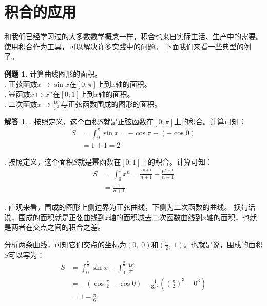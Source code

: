\documentclass[12pt,UTF8]{ctexbook}
\theoremstyle{definition}
\newtheorem{et}{例题}[section]
\newtheorem*{so}{解答}
\theoremstyle{plain}
\begin{document}
\section{积合的应用}

和我们已经学习过的大多数数学概念一样，积合也来自实际生活、生产中的需要。使用积合作为工具，可以解决许多实践中的问题。
下面我们来看一些典型的例子。

\begin{et}
    计算曲线图形的面积。\\
    . 正弦函数$x\mapsto \sin{x}$在$[0;\pi]$上到$x$轴的面积。 \\
    . 幂函数$x\mapsto x^n$在$[0;1]$上到$x$轴的面积。\\
    . 二次函数$x \mapsto \frac{4x^2}{\pi^2}$与正弦函数围成的图形的面积。
\end{et}

\begin{so}
    . 按照定义，这个面积$S$就是正弦函数在$[0;\pi]$上的积合。计算可知：
    \begin{align*}
        S &= \int_{0}^{\pi} \sin{x} = -\cos{\pi} - (-\cos{0}) \\
        &= 1 + 1 = 2
    \end{align*}

    . 按照定义，这个面积$S$就是幂函数在$[0;1]$上的积合。计算可知：
    \begin{align*}
        S &= \int_{0}^{1} x^n = \frac{1^{n+1}}{n+1}- \frac{0^{n+1}}{n+1} \\
        &= \frac{1}{n+1}
    \end{align*}

    . 直观来看，围成的图形上侧边界为正弦曲线，下侧为二次函数的曲线。
    换句话说，围成的面积就是正弦曲线到$x$轴的面积减去二次函数曲线到$x$轴的面积，也就是两者在交点之间的积合之差。

    \indent 分析两条曲线，可知它们交点的坐标为$(0,\;0)$和$\left(\frac{\pi}{2},\;1\right)$。也就是说，围成的面积$S$可以写为：
    \begin{align*}
        S &= \int_{0}^{\frac{\pi}{2}} \sin{x} - \int_{0}^{\frac{\pi}{2}} \frac{4x^2}{\pi^2} \\ 
        &= -\left(\cos{\frac{\pi}{2}} - \cos{0}\right) - \frac{4}{3\pi^2} \left( \left( \frac{\pi}{2} \right)^3 - 0^3 \right) \\
        &= 1 - \frac{\pi}{6}
    \end{align*}
\end{so}
\end{document}

